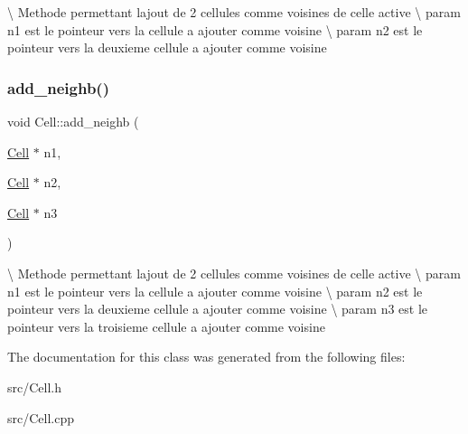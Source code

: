 \textbackslash{} Methode permettant l\textquotesingle{}ajout de 2 cellules comme voisines de celle active \textbackslash{} param n1 est le pointeur vers la cellule a ajouter comme voisine \textbackslash{} param n2 est le pointeur vers la deuxieme cellule a ajouter comme voisine\mbox{\label{class_cell_a60802074b978ca9e07e0b66c6470fccd}} 
\subsubsection{\texorpdfstring{add\+\_\+neighb()}{add\_neighb()}\hspace{0.1cm}{\footnotesize\ttfamily [3/3]}}
{\footnotesize\ttfamily void Cell\+::add\+\_\+neighb (\begin{DoxyParamCaption}\item[{\hyperlink{class_cell}{Cell} $\ast$}]{n1,  }\item[{\hyperlink{class_cell}{Cell} $\ast$}]{n2,  }\item[{\hyperlink{class_cell}{Cell} $\ast$}]{n3 }\end{DoxyParamCaption})}

\textbackslash{} Methode permettant l\textquotesingle{}ajout de 2 cellules comme voisines de celle active \textbackslash{} param n1 est le pointeur vers la cellule a ajouter comme voisine \textbackslash{} param n2 est le pointeur vers la deuxieme cellule a ajouter comme voisine \textbackslash{} param n3 est le pointeur vers la troisieme cellule a ajouter comme voisine

The documentation for this class was generated from the following files\+:\begin{DoxyCompactItemize}
\item 
src/Cell.\+h\item 
src/Cell.\+cpp\end{DoxyCompactItemize}

